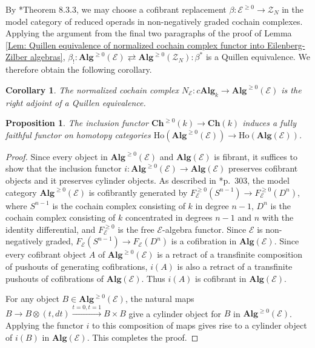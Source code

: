 \documentclass[11pt]{amsart}
\newtheorem{proposition}[theorem]{Proposition}
\newtheorem{corollary}[theorem]{Corollary}
\theoremstyle{definition}
\numberwithin{equation}{section}
\numberwithin{equation}{section}
\begin{document}
By \cite{Richter-cosimplicial-algebras-and-normalization-functor}*{Theorem 8.3.3}, we may choose a cofibrant replacement $\beta:\mathcal{E}^{\geq 0}\rightarrow \mathcal{Z}_N$ in the model category of reduced operads in non-negatively graded cochain complexes. Applying the argument from the final two paragraphs of the proof of Lemma \ref{Lem: Quillen equivalence of normalized cochain complex functor into Eilenberg-Zilber algebras}, $\beta_{!}:\mathbf{Alg}^{\geq 0}(\mathcal{E})\rightleftarrows \mathbf{Alg}^{\geq 0}(\mathcal{Z}_N):\beta^*$ is a Quillen equivalence. We therefore obtain the following corollary.

\begin{corollary}
The normalized cochain complex $N_{\mathcal{E}}:c\mathbf{Alg}_k\rightarrow \mathbf{Alg}^{\geq 0}(\mathcal{E})$ is the right adjoint of a Quillen equivalence.
\end{corollary}

\begin{proposition}\label{Prop: embedding of non-negatively graded E_infinity algebras to unbounded E_infinity algebras}
The inclusion functor $\mathbf{Ch}^{\geq 0}(k)\rightarrow \mathbf{Ch}(k)$ induces a fully faithful functor on homotopy categories $\mathrm{Ho}(\mathbf{Alg}^{\geq 0}(\mathcal{E}))\rightarrow \mathrm{Ho}(\mathbf{Alg}(\mathcal{E}))$.
\end{proposition}

\begin{proof}
Since every object in $\mathbf{Alg}^{\geq 0}(\mathcal{E})$ and $\mathbf{Alg}(\mathcal{E})$ is fibrant, it suffices to show that the inclusion functor $i:\mathbf{Alg}^{\geq 0}(\mathcal{E})\rightarrow \mathbf{Alg}(\mathcal{E})$ preserves cofibrant objects and it preserves cylinder objects. As described in \cite{Richter-cosimplicial-algebras-and-normalization-functor}*{p.~303}, the model category $\mathbf{Alg}^{\geq 0}(\mathcal{E})$ is cofibrantly generated by $F^{\geq 0}_{\mathcal{E}}(S^{n-1})\rightarrow F^{\geq 0}_{\mathcal{E}}(D^n)$, where $S^{n-1}$ is the cochain complex consisting of $k$ in degree $n-1$, $D^{n}$ is the cochain complex consisting of $k$ concentrated in degrees $n-1$ and $n$ with the identity differential, and $F^{\geq 0}_{\mathcal{E}}$ is the free $\mathcal{E}$-algebra functor. Since $\mathcal{E}$ is non-negatively graded, $F_{\mathcal{E}}(S^{n-1})\rightarrow F_{\mathcal{E}}(D^n)$ is a cofibration in $\mathbf{Alg}(\mathcal{E})$. Since every cofibrant object $A$ of $\mathbf{Alg}^{\geq 0}(\mathcal{E})$ is a retract of a transfinite composition of pushouts of generating cofibrations, $i(A)$ is also a retract of a transfinite pushouts of cofibrations of $\mathbf{Alg}(\mathcal{E})$. Thus $i(A)$ is cofibrant in $\mathbf{Alg}(\mathcal{E})$.

For any object $B\in \mathbf{Alg}^{\geq 0}(\mathcal{E})$, the natural maps $B\rightarrow B\otimes (t,dt)\xrightarrow{t=0,t=1}B\times B$ give a cylinder object for $B$ in $\mathbf{Alg}^{\geq 0}(\mathcal{E})$. Applying the functor $i$ to this composition of maps gives rise to a cylinder object of $i(B)$ in $\mathbf{Alg}(\mathcal{E})$. This completes the proof.
\end{proof}
\end{document}
